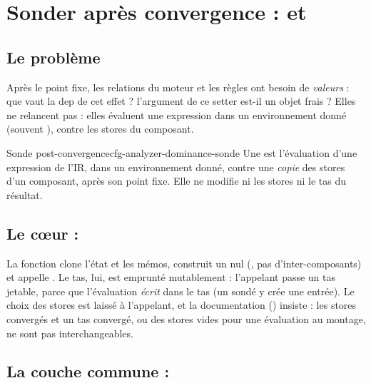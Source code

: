 \section{Sonder après convergence :  et }
\label{sec:cfg-analyzer-dominance-sondes}

\subsection{Le problème}

Après le point fixe, les relations du moteur et les règles ont besoin de
\emph{valeurs} : que vaut la dep  de cet effet ? l'argument de
ce setter est-il un objet frais ? Elles ne relancent pas  :
elles évaluent une expression dans un environnement donné (souvent
), contre les stores du composant.

\begin{definition}{Sonde post-convergence}{cfg-analyzer-dominance-sonde}
  Une  est l'évaluation d'une expression de l'IR, dans un
  environnement donné, contre une \emph{copie} des stores d'un composant,
  après son point fixe. Elle ne modifie ni les stores ni le tas du résultat.
\end{definition}

\subsection{Le cœur : }


La fonction clone l'état et les mémos, construit un  nul
(, pas d'inter-composants) et appelle . Le tas,
lui, est emprunté mutablement : l'appelant passe un tas jetable, parce que
l'évaluation \emph{écrit} dans le tas (un  sondé y crée une
entrée). Le choix des stores est laissé à l'appelant, et la documentation
() insiste : les stores convergés et un tas
convergé, ou des stores vides pour une évaluation \og au montage\fg, ne sont
pas interchangeables.

\subsection{La couche commune : }

